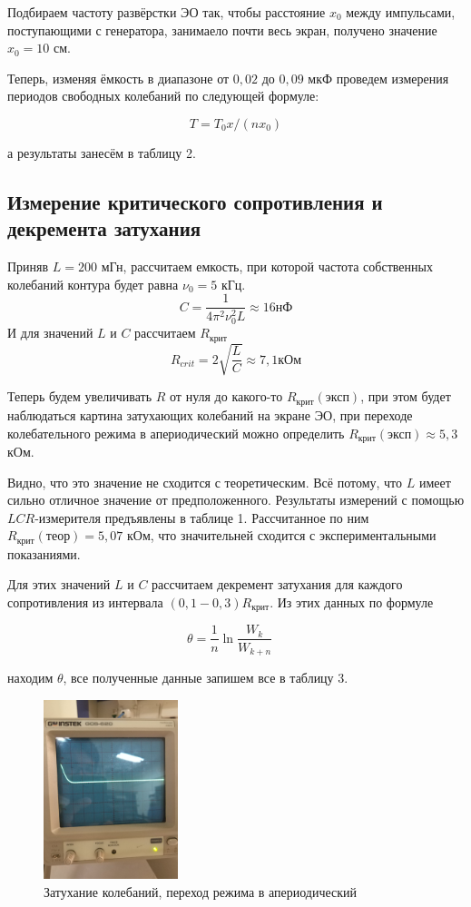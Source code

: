 \documentclass[a4paper, 12pt]{article}%
\begin{document}
Подбираем частоту развёрстки ЭО так, чтобы расстояние $x_0$ между импульсами, поступающими с генератора, занимаело почти весь экран, получено значение $x_0 = 10$ см. 

Теперь, изменяя ёмкость в диапазоне от $0,02$ до $0,09$ мкФ проведем измерения периодов свободных колебаний по следующей формуле:

\[T = T_0x / (nx_0) \]

а результаты занесём в таблицу 2.


\subsection{Измерение критического сопротивления и декремента затухания}

Приняв $L = 200$ мГн, рассчитаем емкость, при которой частота собственных колебаний контура будет равна $\nu_0 = 5$ кГц.
\[C = \dfrac{1}{4 \pi^2 \nu_0^2 L} \approx 16 \text{нФ}\]
И для значений $L$ и $C$ рассчитаем $R_{\text{крит}}$
\[R_{crit} = 2\sqrt{\dfrac{L}{C}} \approx 7,1 \text{кОм}\]

Теперь будем увеличивать $R$ от нуля до какого-то $R_{\text{крит}} (\text{эксп})$, при этом будет наблюдаться картина затухающих колебаний на экране ЭО, при переходе колебательного режима в апериодический можно определить $R_{\text{крит}} (\text{эксп}) \approx 5,3 $ кОм.

Видно, что это значение не сходится с теоретическим. Всё потому, что $L$ имеет сильно отличное значение от предположенного. Результаты измерений с помощью $LCR$-измерителя предъявлены в таблице 1. Рассчитанное по ним $R_{\text{крит}} (\text{теор}) = 5,07$ кОм, что значительней сходится с экспериментальными показаниями.

Для этих значений $L$ и $C$ рассчитаем декремент затухания для каждого сопротивления из интервала $(0,1-0,3)R_{\text{крит}}$. Из этих данных по формуле
 
\[\theta = \frac{1}{n} \ln\frac{W_k}{W_{k+n}} \quad  \]

находим $\theta$, все полученные данные запишем все в таблицу 3. 


\begin{figure}[h]
\begin{center}
\includegraphics[width = 0.35\textwidth]{2.jpg}
\caption{Затухание колебаний, переход режима в апериодический}
\end{center}
\end{figure}
\end{document}
